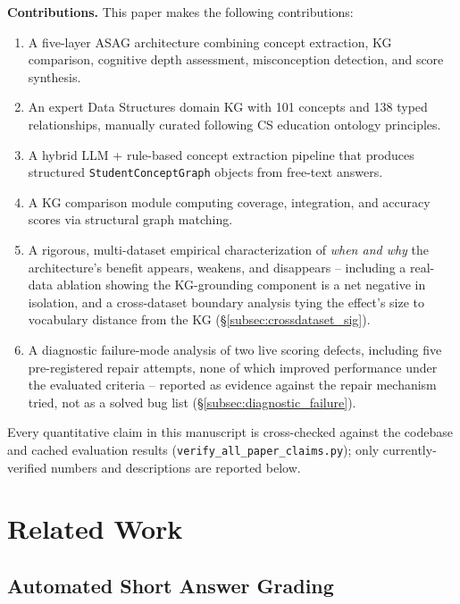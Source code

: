 \documentclass[conference]{IEEEtran}
\begin{document}
\textbf{Contributions.} This paper makes the following contributions:
\begin{enumerate}
  \item A five-layer ASAG architecture combining concept extraction, KG comparison,
        cognitive depth assessment, misconception detection, and score synthesis.
  \item An expert Data Structures domain KG with 101 concepts and 138 typed
        relationships, manually curated following CS education ontology principles.
  \item A hybrid LLM + rule-based concept extraction pipeline that produces
        structured \texttt{StudentConceptGraph} objects from free-text answers.
  \item A KG comparison module computing coverage, integration, and accuracy scores
        via structural graph matching.
  \item A rigorous, multi-dataset empirical characterization of \emph{when and
        why} the architecture's benefit appears, weakens, and disappears --
        including a real-data ablation showing the KG-grounding component is
        a net negative in isolation, and a cross-dataset boundary analysis
        tying the effect's size to vocabulary distance from the KG
        (\S\ref{subsec:crossdataset_sig}).
  \item A diagnostic failure-mode analysis of two live scoring defects,
        including five pre-registered repair attempts, none of which improved
        performance under the evaluated criteria -- reported as evidence
        against the repair mechanism tried, not as a solved bug list
        (\S\ref{subsec:diagnostic_failure}).
\end{enumerate}

Every quantitative claim in this manuscript is cross-checked against
the codebase and cached evaluation results
(\texttt{verify\_all\_paper\_claims.py}); only currently-verified
numbers and descriptions are reported below.

\section{Related Work}

\subsection{Automated Short Answer Grading}
\end{document}
